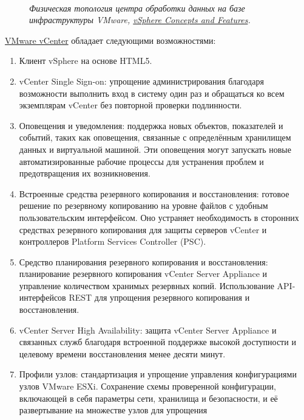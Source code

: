 \documentclass[14pt, a4paper]{article}
\begin{document}
\begin{figure}[h]
    \centering
    \\ 
    \small\textit{Физическая топология центра обработки данных на базе инфраструктуры VMware,
    \href{https://docs.vmware.com/en/VMware-vSphere/index.html}{vSphere Concepts and Features}.}  
    \label{framework} 
\end{figure}

\href{https://www.vmware.com/content/dam/digitalmarketing/vmware/ru/pdf/products/vCenter/vmw-datasheetvcenter.pdf}{VMware vCenter} обладает следующими возможностями:
\begin{enumerate}
    \item Клиент vSphere на основе HTML5.
    \item vCenter Single Sign-on: упрощение администрирования благодаря возможности выполнить
    вход в систему один раз и обращаться ко всем экземплярам vCenter без повторной проверки
    подлинности.
    \item Оповещения и уведомления: поддержка новых объектов, показателей и событий, таких как
    оповещения, связанные с определённым хранилищем данных и виртуальной машиной. Эти
    оповещения могут запускать новые автоматизированные рабочие процессы для устранения
    проблем и предотвращения их возникновения.
    \item Встроенные средства резервного копирования и восстановления: готовое решение по
    резервному копированию на уровне файлов с удобным пользовательским интерфейсом. Оно
    устраняет необходимость в сторонних средствах резервного копирования для защиты
    серверов vCenter и контроллеров Platform Services Controller (PSC).
    \item Средство планирования резервного копирования и восстановления: планирование резервного
    копирования vCenter Server Appliance и управление количеством хранимых резервных копий.
    Использование API-интерфейсов REST для упрощения резервного копирования и
    восстановления.
    \item vCenter Server High Availability: защита vCenter Server Appliance и связанных служб благодаря
    встроенной поддержке высокой доступности и целевому времени восстановления менее
    десяти минут.
    \item Профили узлов: стандартизация и упрощение управления конфигурациями узлов VMware
    ESXi. Сохранение схемы проверенной конфигурации, включающей в себя параметры сети,
    хранилища и безопасности, и её развертывание на множестве узлов для упрощения

\end{enumerate}
\end{document}
